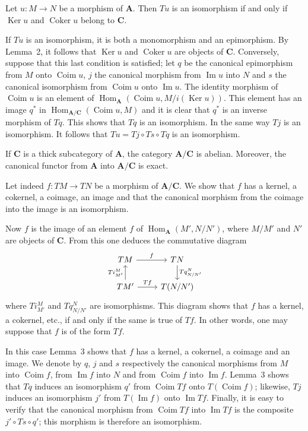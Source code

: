 \begin{lemma}
Let $u:M\to N$ be a morphism of $\mathbf A$. Then $Tu$ is an
isomorphism if and only if $\operatorname{Ker}u$ and
$\operatorname{Coker}u$ belong to $\mathbf C$.
\end{lemma}

If $Tu$ is an isomorphism, it is both a monomorphism and an
epimorphism. By Lemma~2, it follows that $\operatorname{Ker}u$ and
$\operatorname{Coker}u$ are objects of $\mathbf C$. Conversely, suppose
that this last condition is satisfied; let $q$ be the canonical
epimorphism from $M$ onto $\operatorname{Coim}u$, $j$ the canonical
morphism from $\operatorname{Im}u$ into $N$ and $s$ the canonical
isomorphism from $\operatorname{Coim}u$ onto $\operatorname{Im}u$. The
identity morphism of $\operatorname{Coim}u$ is an element of
$\operatorname{Hom}_{\mathbf A}(\operatorname{Coim}u,
M/i(\operatorname{Ker}u))$. This element has an image $q^*$ in
$\operatorname{Hom}_{\mathbf A/\mathbf C}(\operatorname{Coim}u,M)$ and
it is clear that $q^*$ is an inverse morphism of $Tq$. This shows that
$Tq$ is an isomorphism. In the same way $Tj$ is an isomorphism. It
follows that $Tu=Tj\circ Ts\circ Tq$ is an isomorphism.

\begin{proposition}
If $\mathbf C$ is a thick subcategory of $\mathbf A$, the category
$\mathbf A/\mathbf C$ is abelian. Moreover, the canonical functor from
$\mathbf A$ into $\mathbf A/\mathbf C$ is exact.
\end{proposition}

Let indeed $f:TM\to TN$ be a morphism of
$\mathbf A/\mathbf C$. We show that $f$ has a kernel, a cokernel, a
coimage, an image and that the canonical morphism from the coimage into
the image is an isomorphism.

Now $f$ is the image of an element $f$ of
$\operatorname{Hom}_{\mathbf A}(M',N/N')$, where $M/M'$ and $N'$ are
objects of $\mathbf C$. From this one deduces the commutative diagram
\[
\begin{tikzcd}
TM \arrow[r, "f"] & TN \arrow[d, "Tq^{N}_{N/N'}"] \\
TM' \arrow[u, "Ti^{M}_{M'}"] \arrow[r, "Tf"] & T(N/N')
\end{tikzcd}
\]
where $Ti^{M}_{M'}$ and $Tq^{N}_{N/N'}$ are isomorphisms. This diagram shows that
$f$ has a kernel, a cokernel, etc., if and only if the same is true of
$Tf$. In other words, one may suppose that $f$ is of the form $Tf$.

In this case Lemma~3 shows that $f$ has a kernel, a cokernel, a coimage
and an image. We denote by $q$, $j$ and $s$ respectively the canonical
morphisms from $M$ into $\operatorname{Coim}f$, from
$\operatorname{Im}f$ into $N$ and from $\operatorname{Coim}f$ into
$\operatorname{Im}f$. Lemma~3 shows that $Tq$ induces an isomorphism
$q'$ from $\operatorname{Coim}Tf$ onto
$T(\operatorname{Coim}f)$; likewise, $Tj$ induces an isomorphism $j'$
from $T(\operatorname{Im}f)$ onto $\operatorname{Im}Tf$. Finally, it is
easy to verify that the canonical morphism from
$\operatorname{Coim}Tf$ into $\operatorname{Im}Tf$ is the composite
$j'\circ Ts\circ q'$; this morphism is therefore an isomorphism.

